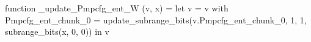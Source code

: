 function _update_Pmpcfg_ent_W (v, x) = let v = { v with Pmpcfg_ent_chunk_0 = update_subrange_bits(v.Pmpcfg_ent_chunk_0, 1, 1, subrange_bits(x, 0, 0)) } in
  v
